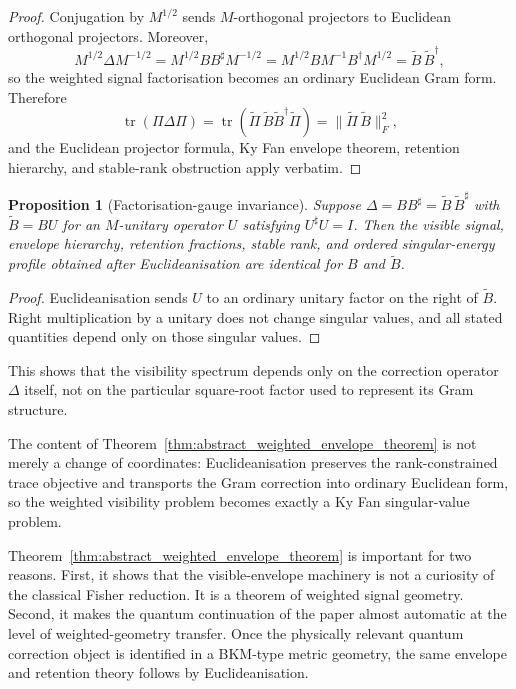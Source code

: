 \documentclass[11pt,a4paper]{article}
\numberwithin{equation}{section}
\theoremstyle{thmcompact}
\newtheorem{proposition}[theorem]{Proposition}
\theoremstyle{remark}
\begin{document}
\begin{proof}
Conjugation by \(M^{1/2}\) sends \(M\)-orthogonal projectors to Euclidean orthogonal projectors. Moreover,
\begin{equation}
M^{1/2}\Delta M^{-1/2}
=
M^{1/2}BB^{\sharp}M^{-1/2}
=
M^{1/2}BM^{-1}B^{\dagger}M^{1/2}
=
\widetilde B\,\widetilde B^{\dagger},
\end{equation}
so the weighted signal factorisation becomes an ordinary Euclidean Gram form. Therefore
\begin{equation}
\operatorname{tr}(\Pi\Delta\Pi)
=
\operatorname{tr}(\widetilde\Pi\,\widetilde B\widetilde B^{\dagger}\widetilde\Pi)
=
\|\widetilde\Pi\,\widetilde B\|_F^2,
\end{equation}
and the Euclidean projector formula, Ky Fan envelope theorem, retention hierarchy, and stable-rank obstruction apply verbatim.
\end{proof}

\begin{proposition}[Factorisation-gauge invariance]
Suppose \(\Delta=BB^{\sharp}=\widetilde B\,\widetilde B^{\sharp}\) with \(\widetilde B=BU\) for an \(M\)-unitary operator \(U\) satisfying \(U^{\sharp}U=I\). Then the visible signal, envelope hierarchy, retention fractions, stable rank, and ordered singular-energy profile obtained after Euclideanisation are identical for \(B\) and \(\widetilde B\).
\end{proposition}

\begin{proof}
Euclideanisation sends \(U\) to an ordinary unitary factor on the right of \(\widetilde B\). Right multiplication by a unitary does not change singular values, and all stated quantities depend only on those singular values.
\end{proof}

This shows that the visibility spectrum depends only on the correction operator \(\Delta\) itself, not on the particular square-root factor used to represent its Gram structure.

The content of Theorem~\ref{thm:abstract_weighted_envelope_theorem} is not merely a change of coordinates: Euclideanisation preserves the rank-constrained trace objective and transports the Gram correction into ordinary Euclidean form, so the weighted visibility problem becomes exactly a Ky Fan singular-value problem.

Theorem~\ref{thm:abstract_weighted_envelope_theorem} is important for two reasons. First, it shows that the visible-envelope machinery is not a curiosity of the classical Fisher reduction. It is a theorem of weighted signal geometry. Second, it makes the quantum continuation of the paper almost automatic at the level of weighted-geometry transfer. Once the physically relevant quantum correction object is identified in a BKM-type metric geometry, the same envelope and retention theory follows by Euclideanisation.
\end{document}
